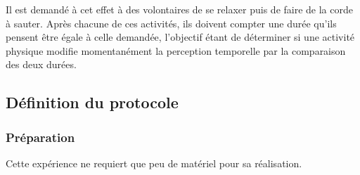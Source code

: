 \documentclass[12pt,fleqn,oneside,french,openany]{book} %
\begin{document}
Il est demandé à cet effet à des volontaires de se relaxer puis de faire de la corde à sauter. Après chacune de ces activités, ils doivent compter une durée qu'ils pensent être égale à celle demandée, l'objectif étant de déterminer si une activité physique modifie momentanément la perception temporelle par la comparaison des deux durées.

\subsection{Définition du protocole} \label{ssec:defProto2.1}

\subsubsection{Préparation} \label{sssec:preparation2.1}
Cette expérience ne requiert que peu de matériel pour sa réalisation.
\end{document}
